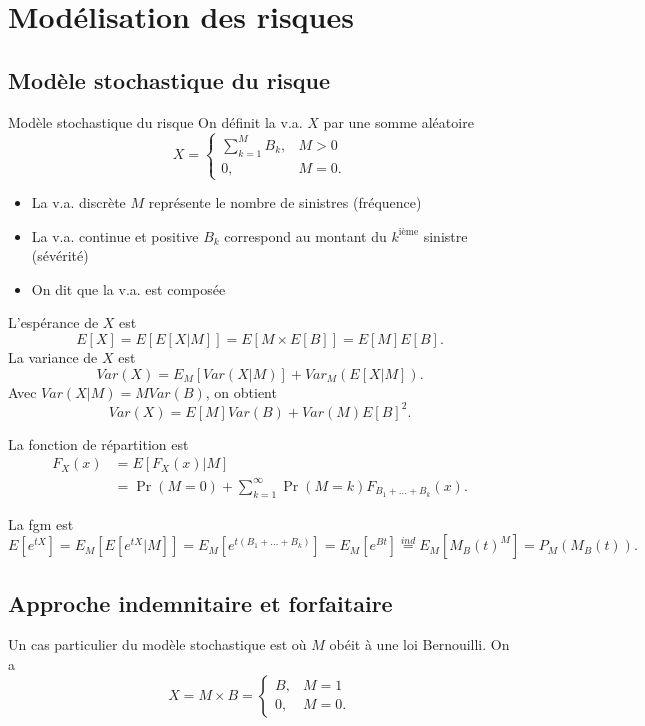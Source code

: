 \chapter{Modélisation des risques}

\section{Modèle stochastique du risque}

\begin{definition}{Modèle stochastique du risque}{}
	On définit la v.a. $X$ par une somme aléatoire 
	$$X = \begin{cases}
	\sum_{k = 1}^{M}B_k, & M>0\\
	0, & M = 0.
	\end{cases}$$
	
	\begin{itemize}
		\item La v.a. discrète $M$ représente le nombre de sinistres (fréquence)
		\item La v.a. continue et positive $B_k$ correspond au montant du $k^{\text{ième}}$ sinistre (sévérité)
		\item On dit que la v.a. est composée
	\end{itemize}
\end{definition}

L'espérance de $X$ est 
$$E[X] = E[E[X \vert M]] = E[M \times E[B]] = E[M]E[B].$$
La variance de $X$ est 
$$Var(X) = E_M[Var(X\vert M)] + Var_M(E[X \vert M]).$$
Avec $Var(X \vert M) = M Var(B)$, on obtient
$$Var(X) = E[M]Var(B) + Var(M)E[B]^2.$$

La fonction de répartition est 
\begin{align*}
	F_X(x) & = E[F_X(x) \vert M]                                                      \\
	       & = \Pr(M = 0) + \sum_{k = 1}^{\infty} \Pr(M = k)F_{B_1 + \dots + B_k}(x).
\end{align*}

La fgm est 
$$E\left[e^{tX}\right] = E_M\left[E\left[e^{tX}\vert M\right]\right] = E_M\left[e^{t(B_1 + \dots + B_k)}\right] = E_M\left[e^{Bt}\right] \stackrel{ind}{=} E_M\left[M_B(t)^M\right] = P_M(M_B(t)).$$

\section{Approche indemnitaire et forfaitaire}

Un cas particulier du modèle stochastique est où $M$ obéit à une loi Bernouilli. On a 
$$X = M \times B = \begin{cases}
B, & M = 1\\
0, & M = 0.
\end{cases}$$

